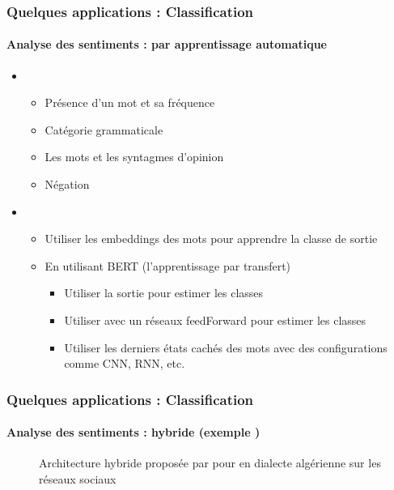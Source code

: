 \documentclass[xcolor=table]{beamer}
\begin{document}
\begin{frame}
	\frametitle{Quelques applications : Classification}
	\framesubtitle{Analyse des sentiments : par apprentissage automatique}
	
	\begin{itemize}
		\item {}
		\begin{itemize}
			\item Présence d'un mot et sa fréquence 
			\item Catégorie grammaticale
			\item Les mots et les syntagmes d'opinion
			\item Négation
		\end{itemize}
		\item {}
		\begin{itemize}
			\item Utiliser les embeddings des mots pour apprendre la classe de sortie
			\item En utilisant BERT (l'apprentissage par transfert)
			\begin{itemize}
				\item Utiliser la sortie \keyword{[CLS]} pour estimer les classes
				\item Utiliser \keyword{[CLS]} avec un réseaux feedForward pour estimer les classes
				\item Utiliser les derniers états cachés des mots avec des configurations comme CNN, RNN, etc.
			\end{itemize}
		\end{itemize}
	\end{itemize}

\end{frame}

\begin{frame}
	\frametitle{Quelques applications : Classification}
	\framesubtitle{Analyse des sentiments : hybride (exemple \cite{18-bettiche-al}) }
	
	\begin{figure}
		\centering
		\caption{Architecture hybride proposée par \cite{18-bettiche-al} pour  en dialecte algérienne sur les réseaux sociaux}
	\end{figure}
	
\end{frame}
\end{document}
